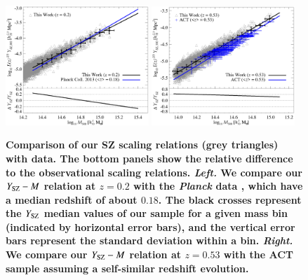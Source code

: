\documentclass[useAMS,usenatbib]{mn2e}
\begin{document}
\begin{figure} 
\centering
\includegraphics[width=0.48\textwidth]{figures/sz_m.eps}
\includegraphics[width=0.48\textwidth]{figures/sz_m_ACT.eps}
\caption{{\bf Comparison of our SZ scaling relations (grey triangles) with
    data. The bottom panels show the relative difference to the observational
    scaling relations. \emph{Left.}  We compare our $Y_{{\mathrm{SZ}}}-M$ relation at
    $z=0.2$ with the {\em Planck} data \citep[blue,][]{2013arXiv1303.5080P},
    which have a median redshift of about $0.18$.  The black crosses represent
    the $Y_{{\mathrm{SZ}}}$ median values of our sample for a given mass bin
    (indicated by horizontal error bars), and the vertical error bars represent
    the standard deviation within a bin. \emph{Right.} We compare our
    $Y_{{\mathrm{SZ}}}-M$ relation at $z=0.53$ with the ACT sample
    \protect\citep[blue,][]{2013JCAP...07..008H} assuming a self-similar
    redshift evolution.}}
\label{fig:SZ_M}
\end{figure}
\end{document}
